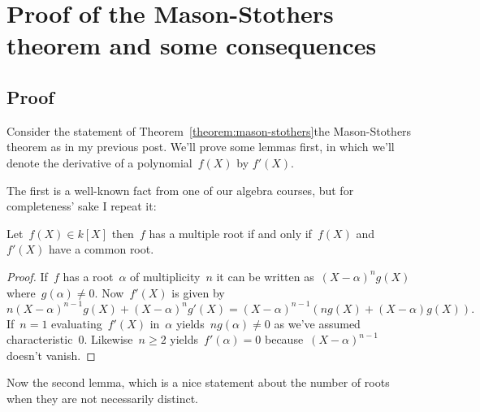 \section{Proof of the Mason-Stothers theorem and some consequences}
\label{section:proof-and-consequences}

\subsection{Proof}

Consider the statement of \iftex Theorem~\ref{theorem:mason-stothers}\fi\ifblog the Mason-Stothers theorem as in my previous post\fi. We'll prove some lemmas first, in which we'll denote the derivative of a polynomial~$f(X)$ by $f'(X)$.

The first is a well-known fact from one of our algebra courses, but for completeness' sake I repeat it:

\begin{lemma}
  Let~$f(X)\in k[X]$ then~$f$ has a multiple root if and only if~$f(X)$ and~$f'(X)$ have a common root.

  \begin{proof}
    If~$f$ has a root~$\alpha$ of multiplicity~$n$ it can be written as~$(X-\alpha)^ng(X)$ where~$g(\alpha)\neq 0$. Now~$f'(X)$ is given by
    \begin{equation}
      n(X-\alpha)^{n-1}g(X)+(X-\alpha)^ng'(X)=(X-\alpha)^{n-1}\left( ng(X)+(X-\alpha)g(X) \right).
    \end{equation}
    If~$n=1$ evaluating~$f'(X)$ in~$\alpha$ yields~$ng(\alpha)\neq 0$ as we've assumed characteristic~$0$. Likewise~$n\geq 2$ yields~$f'(\alpha)=0$ because~$(X-\alpha)^{n-1}$ doesn't vanish.
  \end{proof}
\end{lemma}

Now the second lemma, which is a nice statement about the number of roots when they are not necessarily distinct.

